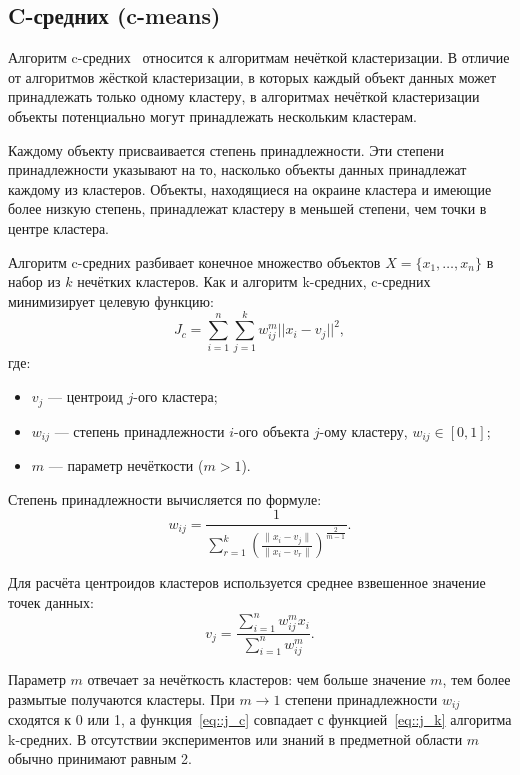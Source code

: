 \subsection{C-средних (c-means)}
Алгоритм c-средних~\cite{c_means} относится к алгоритмам нечёткой кластеризации. В отличие от алгоритмов жёсткой кластеризации, в которых каждый объект данных может принадлежать только одному кластеру, в алгоритмах нечёткой кластеризации объекты потенциально могут принадлежать нескольким кластерам.

Каждому объекту присваивается степень принадлежности. Эти степени принадлежности указывают на то, насколько объекты данных принадлежат каждому из кластеров. Объекты, находящиеся на окраине кластера и имеющие более низкую степень, принадлежат кластеру в меньшей степени, чем точки в центре кластера.

Алгоритм c-средних разбивает конечное множество объектов $X = \{x_1, \dots, x_n\}$ в набор из $k$ нечётких кластеров. Как и алгоритм k-средних, c-средних минимизирует целевую функцию:
\begin{equation}
	J_c = \sum_{i=1}^{n} \sum_{j = 1}^{k} w_{ij}^{m} ||x_i - v_j||^2,
	\label{eq::j_c}
\end{equation}
где:
\begin{itemize}
	\item[---] $v_j$ --- центроид $j$-ого кластера;
	\item[---] $w_{ij}$ --- степень принадлежности $i$-ого объекта $j$-ому кластеру, $w_{ij} \in [0, 1]$;
	\item[---] $m$ --- параметр нечёткости ($m > 1$).
\end{itemize}

Степень принадлежности вычисляется по формуле:
\begin{equation}
	w_{ij} = \frac{1}{\sum\limits_{r=1}^{k} \left( \frac{\|x_i - v_j\|}{\|x_i - v_r\|} \right)^{\frac{2}{m - 1}}}.
	\label{eq::w_i}
\end{equation}

Для расчёта центроидов кластеров используется среднее взвешенное значение точек данных:
\begin{equation}
	v_{j} = \frac{\sum\limits_{i=1}^{n}w_{ij}^m x_i}{\sum\limits_{i=1}^{n} w_{ij}^m}.
	\label{eq::centre}
\end{equation}

Параметр $m$ отвечает за нечёткость кластеров: чем больше значение $m$, тем более размытые получаются кластеры. При $m \to 1$ степени принадлежности $w_{ij}$ сходятся к 0 или 1, а функция~\ref{eq::j_c} совпадает с функцией~\ref{eq::j_k} алгоритма k-средних. В отсутствии экспериментов или знаний в предметной области $m$ обычно принимают равным 2.

